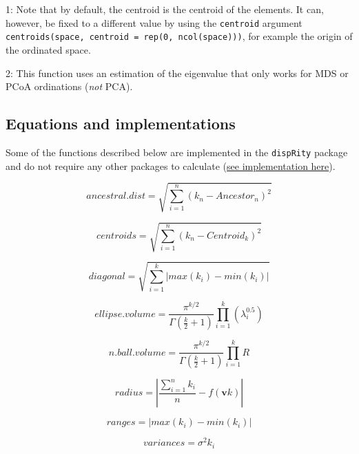 \documentclass[]{book}
\theoremstyle{definition}
\theoremstyle{definition}
\theoremstyle{remark}
\begin{document}
1: Note that by default, the centroid is the centroid of the elements.
It can, however, be fixed to a different value by using the
\texttt{centroid} argument
\texttt{centroids(space,\ centroid\ =\ rep(0,\ ncol(space)))}, for
example the origin of the ordinated space.

2: This function uses an estimation of the eigenvalue that only works
for MDS or PCoA ordinations (\emph{not} PCA).

\subsection{Equations and
implementations}\label{equations-and-implementations}

Some of the functions described below are implemented in the
\texttt{dispRity} package and do not require any other packages to
calculate
(\href{https://github.com/TGuillerme/dispRity/blob/master/R/dispRity.metric.R}{see
implementation here}).

\begin{equation}
    ancestral.dist = \sqrt{\sum_{i=1}^{n}{({k}_{n}-Ancestor_{n})^2}}
\end{equation}

\begin{equation}
    centroids = \sqrt{\sum_{i=1}^{n}{({k}_{n}-Centroid_{k})^2}}
\end{equation}

\begin{equation}
    diagonal = \sqrt{\sum_{i=1}^{k}|max(k_i) - min(k_i)|}
\end{equation}

\begin{equation}
    ellipse.volume = \frac{\pi^{k/2}}{\Gamma(\frac{k}{2}+1)}\displaystyle\prod_{i=1}^{k} (\lambda_{i}^{0.5})
\end{equation}

\begin{equation}
    n.ball.volume = \frac{\pi^{k/2}}{\Gamma(\frac{k}{2}+1)}\displaystyle\prod_{i=1}^{k} R
\end{equation}

\begin{equation}
    radius = |\frac{\sum_{i=1}^{n}k_i}{n} - f(\mathbf{v}k)|
\end{equation}

\begin{equation}
    ranges = |max(k_i) - min(k_i)|
\end{equation}

\begin{equation}
    variances = \sigma^{2}{k_i}
\end{equation}
\end{document}
